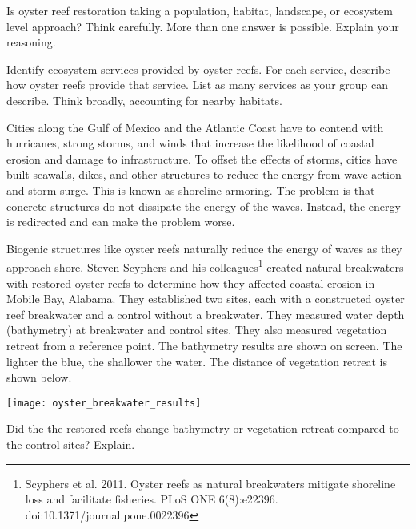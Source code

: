 \documentclass[12pt, addpoints, hidelinks]{exam}
\begin{document}
\begin{questions}

\question[5]
Is oyster reef restoration taking a population, habitat, landscape, or ecosystem level approach? Think carefully. More than one answer is possible. Explain your reasoning.


\question[5]
Identify ecosystem services provided by oyster reefs. For each service, describe how oyster reefs provide that service. List as many services as your group can describe. Think broadly, accounting for nearby habitats.


\newpage

Cities along the Gulf of Mexico and the Atlantic Coast have to contend with hurricanes, strong storms, and winds that increase the likelihood of coastal erosion and damage to infrastructure. To offset the effects of storms, cities have built seawalls, dikes, and other structures to reduce the energy from wave action and storm surge. This is known as shoreline armoring. The problem is that concrete structures do not dissipate the energy of the waves. Instead, the energy is redirected and can make the problem worse. 

Biogenic structures like oyster reefs naturally reduce the energy of waves as they approach shore. Steven Scyphers and his colleagues\footnote{Scyphers et al. 2011. Oyster reefs as natural breakwaters mitigate shoreline loss and facilitate fisheries. PLoS ONE 6(8):e22396. doi:10.1371/journal.pone.0022396} created natural breakwaters with restored oyster reefs to determine how they affected coastal erosion in Mobile Bay, Alabama. They established two sites, each with a constructed oyster reef breakwater and a control without a breakwater.  They measured water depth (bathymetry) at breakwater and control sites. They also measured vegetation retreat from a reference point. The bathymetry results are shown on screen. The lighter the blue, the shallower the water. The distance of vegetation retreat is shown below.

\texttt{[image: oyster\_breakwater\_results]}

\question[5]
Did the the restored reefs change bathymetry or vegetation retreat compared to the control sites? Explain.

\newpage



\end{questions}
\end{document}
